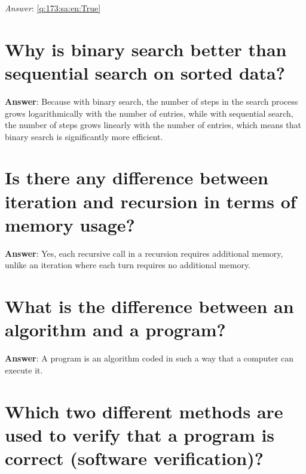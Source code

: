 \documentclass[a4paper,11pt,oneside]{book}
\begin{document}
\begin{sloppypar}
\label{q:173:sa:en:True}

\vspace{2cm}

\noindent\makebox[\textwidth]{\hrulefill}

\vspace{1cm}

\textit{Answer}: \autoref{q:173:sa:en:True}



\section{Why is binary search better than sequential search on sorted data?}

\label{q:174:sa:en:True}

\textbf{Answer}: Because with binary search, the number of steps in the search process grows logarithmically with the number of entries, while with sequential search, the number of steps grows linearly with the number of entries, which means that binary search is significantly more efficient.



\section{Is there any difference between iteration and recursion in terms of memory usage?}

\label{q:175:sa:en:True}

\textbf{Answer}: Yes, each recursive call in a recursion requires additional memory, unlike an iteration where each turn requires no additional memory.



\section{What is the difference between an algorithm and a program?}

\label{q:177:sa:en:True}

\textbf{Answer}: A program is an algorithm coded in such a way that a computer can execute it.



\section{Which two different methods are used to verify that a program is correct (software verification)?}


\end{sloppypar}
\end{document}

